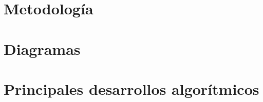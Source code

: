 \section{Metodología}

\section{Diagramas}

\section{Principales desarrollos algorítmicos}

\endinput
